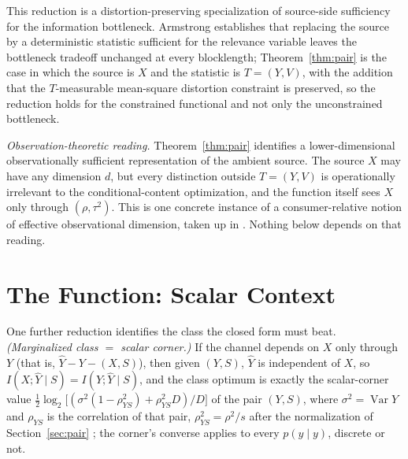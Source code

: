 ﻿\documentclass[11pt,onecolumn]{IEEEtran}
\newcommand{\hY}{\widehat{Y}}
\begin{document}
This reduction is a distortion-preserving specialization of source-side
sufficiency for the information bottleneck. Armstrong \cite{armstrong2026}
establishes that replacing the source by a deterministic statistic
sufficient for the relevance variable leaves the bottleneck tradeoff
unchanged at every blocklength; Theorem~\ref{thm:pair} is the case in
which the source is $X$ and the statistic is $T=(Y,V)$, with the
addition that the
$T$-measurable mean-square distortion constraint is preserved, so the
reduction holds for the constrained functional and not only the
unconstrained bottleneck.

\emph{Observation-theoretic reading.} Theorem~\ref{thm:pair} identifies
a lower-dimensional observationally sufficient representation of the
ambient source. The source $X$ may have any dimension $d$, but every
distinction outside $T=(Y,V)$ is operationally irrelevant to the
conditional-content optimization, and the function itself sees $X$ only
through $(\rho,\tau^2)$. This is one concrete instance of a
consumer-relative notion of effective observational dimension, taken up
in \cite{bond2026ot}. Nothing below depends on that reading.

\section{The Function: Scalar Context}
\label{sec:function}

One further reduction identifies the class the closed form must beat.
\emph{(Marginalized class $=$ scalar corner.)} If the channel depends on $X$
only through $Y$ (that is, $\hY-Y-(X,S)$), then given $(Y,S)$, $\hY$ is
independent of $X$, so $I(X;\hY\mid S)=I(Y;\hY\mid S)$, and the class
optimum is exactly the scalar-corner value
$\tfrac12\log_2\bigl[(\sigma^2(1-\rho_{YS}^2)+\rho_{YS}^2D)/D\bigr]$ of the
pair $(Y,S)$, where $\sigma^2=\operatorname{Var}Y$ and $\rho_{YS}$ is the
correlation of that pair, $\rho_{YS}^2=\rho^2/s$ after the normalization
of Section~\ref{sec:pair} \cite{steinberg2009}; the
corner's converse applies to every $p(\hat y\mid y)$, discrete or not.
\end{document}
